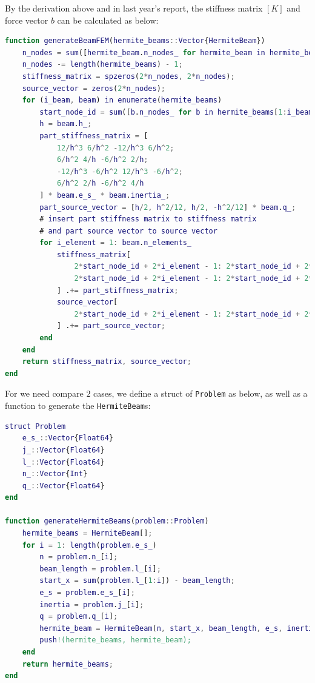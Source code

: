 By the derivation above and in last year's report,
the stiffness matrix $[K]$ and force vector $b$ can be calculated as below:
\begin{lstlisting}[language=matlab]
function generateBeamFEM(hermite_beams::Vector{HermiteBeam})
    n_nodes = sum([hermite_beam.n_nodes_ for hermite_beam in hermite_beams]);
    n_nodes -= length(hermite_beams) - 1;
    stiffness_matrix = spzeros(2*n_nodes, 2*n_nodes);
    source_vector = zeros(2*n_nodes);
    for (i_beam, beam) in enumerate(hermite_beams)
        start_node_id = sum([b.n_nodes_ for b in hermite_beams[1:i_beam-1]]) - (i_beam - 1);
        h = beam.h_;
        part_stiffness_matrix = [
            12/h^3 6/h^2 -12/h^3 6/h^2;
            6/h^2 4/h -6/h^2 2/h;
            -12/h^3 -6/h^2 12/h^3 -6/h^2;
            6/h^2 2/h -6/h^2 4/h
        ] * beam.e_s_ * beam.inertia_;
        part_source_vector = [h/2, h^2/12, h/2, -h^2/12] * beam.q_;
        # insert part stiffness matrix to stiffness matrix
        # and part source vector to source vector
        for i_element = 1: beam.n_elements_
            stiffness_matrix[
                2*start_node_id + 2*i_element - 1: 2*start_node_id + 2*i_element + 2,
                2*start_node_id + 2*i_element - 1: 2*start_node_id + 2*i_element + 2
            ] .+= part_stiffness_matrix;
            source_vector[
                2*start_node_id + 2*i_element - 1: 2*start_node_id + 2*i_element + 2
            ] .+= part_source_vector;
        end
    end
    return stiffness_matrix, source_vector;
end
\end{lstlisting}

For we need compare $2$ cases,
we define a struct of \verb|Problem| as below,
as well as a function to generate the \verb|HermiteBeam|s:
\begin{lstlisting}[language=matlab]
struct Problem
    e_s_::Vector{Float64}
    j_::Vector{Float64}
    l_::Vector{Float64}
    n_::Vector{Int}
    q_::Vector{Float64}
end

function generateHermiteBeams(problem::Problem)
    hermite_beams = HermiteBeam[];
    for i = 1: length(problem.e_s_)
        n = problem.n_[i];
        beam_length = problem.l_[i];
        start_x = sum(problem.l_[1:i]) - beam_length;
        e_s = problem.e_s_[i];
        inertia = problem.j_[i];
        q = problem.q_[i];
        hermite_beam = HermiteBeam(n, start_x, beam_length, e_s, inertia, q);
        push!(hermite_beams, hermite_beam);
    end
    return hermite_beams;
end
\end{lstlisting}

